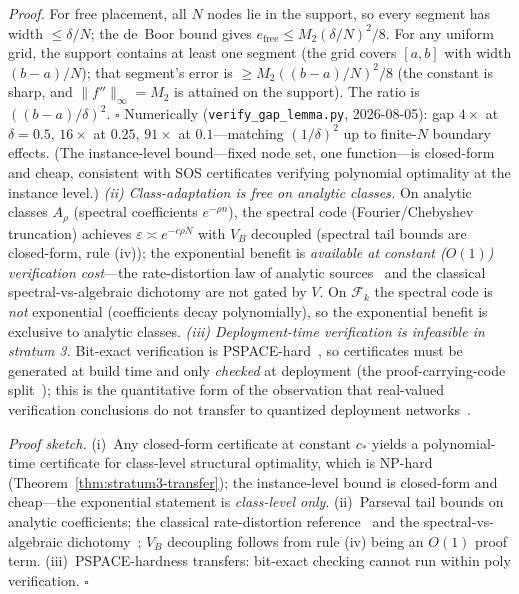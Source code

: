 \begin{theorem}
\vspace{2pt}
\noindent\textit{Proof.}
For free placement, all $N$ nodes lie in the support, so every segment
has width $\leq \delta/N$; the de~Boor bound gives
$e_{\text{free}} \leq M_2 (\delta/N)^2 / 8$. For any uniform grid,
the support contains at least one segment (the grid covers $[a,b]$
with width $(b-a)/N$); that segment's error is
$\geq M_2((b-a)/N)^2/8$ (the constant is sharp, and
$\|f''\|_\infty = M_2$ is attained on the support). The ratio is
$((b-a)/\delta)^2$. $\square$ Numerically
(\texttt{verify\_gap\_lemma.py}, 2026-08-05): gap $4\times$ at
$\delta = 0.5$, $16\times$ at $0.25$, $91\times$ at $0.1$---matching
$(1/\delta)^2$ up to finite-$N$ boundary effects. (The instance-level
bound---fixed node set, one function---is closed-form and cheap,
consistent with SOS certificates verifying polynomial optimality at
the instance level.)
\emph{(ii) Class-adaptation is free on analytic classes.} On analytic
classes $A_\rho$ (spectral coefficients $e^{-\rho n}$), the spectral
code (Fourier/Chebyshev truncation) achieves
$\varepsilon \asymp e^{-c\rho N}$ with $V_B$ decoupled (spectral tail
bounds are closed-form, rule (iv)); the exponential benefit is
\emph{available at constant ($O(1)$) verification cost}---the
rate-distortion law of analytic sources~\cite{shannon1959coding} and
the classical spectral-vs-algebraic dichotomy
\cite{trefethen2013approximation,boyd2001chebyshev} are not gated by
$V$. On $\mathcal{F}_k$ the spectral code is \emph{not} exponential
(coefficients decay polynomially), so the exponential benefit is
exclusive to analytic classes. \emph{(iii) Deployment-time verification
is infeasible in stratum 3.} Bit-exact verification is
PSPACE-hard~\cite{hlz2021quantized}, so certificates must be generated
at build time and only \emph{checked} at deployment (the
proof-carrying-code split~\cite{necula1998pcc}); this is the
quantitative form of the observation that real-valued verification
conclusions do not transfer to quantized deployment
networks~\cite{giacobbe2020bits}.
\end{theorem}

\vspace{2pt}
\noindent\textit{Proof sketch.}
(i)~Any closed-form certificate at constant $c_*$ yields a
polynomial-time certificate for class-level structural optimality,
which is NP-hard (Theorem~\ref{thm:stratum3-transfer}); the
instance-level bound is closed-form and cheap---the
exponential statement is \emph{class-level only}.
(ii)~Parseval tail bounds on analytic coefficients; the classical
rate-distortion reference~\cite{shannon1959coding} and the
spectral-vs-algebraic dichotomy~\cite{trefethen2013approximation};
$V_B$ decoupling follows from rule (iv) being an $O(1)$ proof term.
(iii)~PSPACE-hardness transfers: bit-exact checking cannot run within
poly verification. $\square$

